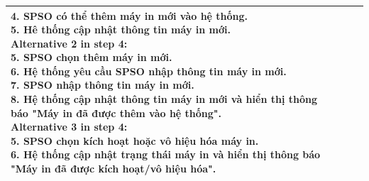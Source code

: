 \begin{table}[h!]
\begin{tabular}{ |p{4cm}|p{3cm}|p{3cm}|p{3cm}|  }
{			4. SPSO có thể thêm máy in mới vào hệ thống.\newline
			5. Hê thống cập nhật thông tin máy in mới.\newline
			Alternative 2 in step 4:\newline
			5. SPSO chọn thêm máy in mới.\newline
			6. Hệ thống yêu cầu SPSO nhập thông tin máy in mới.\newline
			7. SPSO nhập thông tin máy in mới.\newline
			8. Hệ thống cập nhật thông tin máy in mới và hiển thị thông báo "Máy in đã được thêm vào hệ thống".\newline
			Alternative 3 in step 4:\newline
			5. SPSO chọn kích hoạt hoặc vô hiệu hóa máy in.\newline
			6. Hệ thống cập nhật trạng thái máy in và hiển thị thông báo "Máy in đã được kích hoạt/vô hiệu hóa".
		}                                                                                                                                \\
		\hline
	\end{tabular}
\end{table}
\newpage

